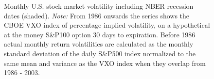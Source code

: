 \documentclass[a4paper,11pt,listof=nochaptergap,oneside,pointednumbers,bibtotoc,bigheadings,liststotoc]{scrbook}
\begin{document}
\begin{figure}[!ht]
   \centering
   \setlength\fboxsep{0pt}
   \setlength\fboxrule{0pt}
      \caption[Monthly U.S. stock market volatility including NBER recession dates.]{Monthly U.S. stock market volatility including NBER recession dates (shaded).
      \textit{Note:} From 1986 onwards the series shows the CBOE VXO index of percentage implied volatility, on a hypothetical at the money S\&P100 option 30 days to expiration. Before 1986 actual monthly return volatilities are calculated as the monthly standard deviation of the daily S\&P500 index normalized to the same mean and variance as the VXO index when they overlap from 1986 - 2003.}
   \label{fig:volatility}
\end{figure}



\end{document}
